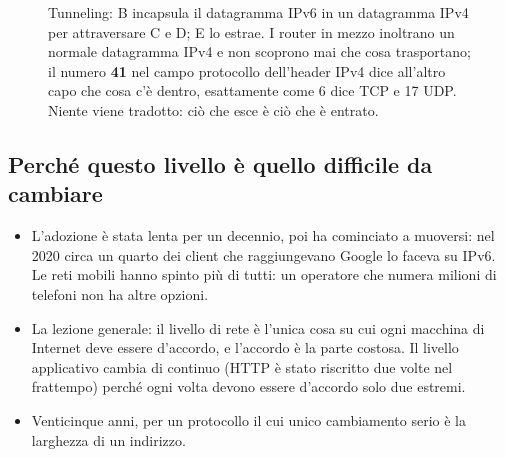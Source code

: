 \begin{figure}[H]
\centering
{}
\caption{Tunneling: B incapsula il datagramma IPv6 in un datagramma IPv4 per attraversare C e D; E lo estrae. I router in
         mezzo inoltrano un normale datagramma IPv4 e non scoprono mai che cosa trasportano; il numero \textbf{41} nel campo
         protocollo dell'header IPv4 dice all'altro capo che cosa c'è dentro, esattamente come 6 dice TCP e 17 UDP. Niente
         viene tradotto: ciò che esce è ciò che è entrato.}
\end{figure}

\subsection{Perché questo livello è quello difficile da cambiare}

\begin{itemize}
    \item L'adozione è stata lenta per un decennio, poi ha cominciato a muoversi: nel 2020 circa un quarto dei client che
          raggiungevano Google lo faceva su IPv6. Le reti mobili hanno spinto più di tutti: un operatore che numera milioni di
          telefoni non ha altre opzioni.
    \item La lezione generale: il livello di rete è l'unica cosa su cui ogni macchina di Internet deve essere d'accordo, e
          l'accordo è la parte costosa. Il livello applicativo cambia di continuo (HTTP è stato riscritto due volte nel
          frattempo) perché ogni volta devono essere d'accordo solo due estremi.
    \item Venticinque anni, per un protocollo il cui unico cambiamento serio è la larghezza di un indirizzo.
\end{itemize}

